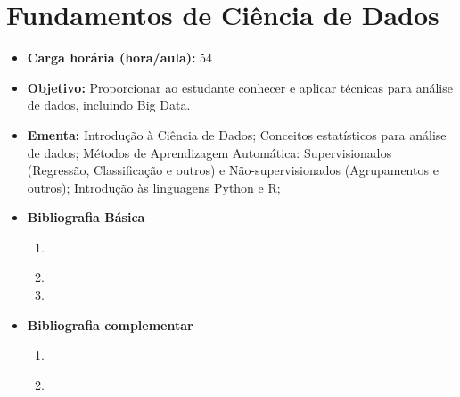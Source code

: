 \documentclass[11pt,fleqn]{book} %
\begin{document}
\section{Fundamentos de Ciência de Dados}\label{6_datascience}
\begin{itemize}
	\item \textbf{Carga horária (hora/aula):} 54
	\item \textbf{Objetivo:} Proporcionar ao estudante conhecer e aplicar técnicas para análise de dados, incluindo Big Data.
	\item \textbf{Ementa:} 
	Introdução à Ciência de Dados;
	Conceitos estatísticos para análise de dados;
	Métodos de Aprendizagem Automática: Supervisionados (Regressão, Classificação e outros) e Não-supervisionados (Agrupamentos e outros);
	Introdução às linguagens Python e R;
	\item \textbf{Bibliografia Básica}
	\begin{enumerate}
		\item \cite{barbetta2004estatistica}
		\item 
		\item 
	\end{enumerate}
	\item \textbf{Bibliografia complementar}
	\begin{enumerate}
		\item \cite{farberestatistica}
		\item
	\end{enumerate} 	
\end{itemize}

\newpage
\end{document}
